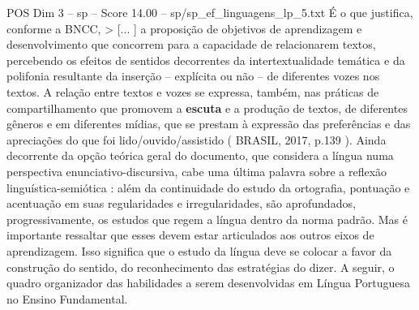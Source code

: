 \begin{textsample}{POS Dim 3 – sp – Score 14.00 – sp/sp\_ef\_linguagens\_lp\_5.txt}
É o que justifica, conforme a BNCC, > [... ] a proposição de objetivos de aprendizagem e desenvolvimento que concorrem para a capacidade de relacionarem textos, percebendo os efeitos de sentidos decorrentes da intertextualidade temática e da polifonia resultante da inserção – explícita ou não – de diferentes vozes nos textos.
A relação entre textos e vozes se expressa, também, nas práticas de compartilhamento que promovem a \textbf{escuta} e a produção de textos, de diferentes gêneros e em diferentes mídias, que se prestam à expressão das preferências e das apreciações do que foi lido/ouvido/assistido ( BRASIL, 2017, p.139 ).
Ainda decorrente da opção teórica geral do documento, que considera a língua numa perspectiva enunciativo-discursiva, cabe uma última palavra sobre a reflexão linguística-semiótica : além da continuidade do estudo da ortografia, pontuação e acentuação em suas regularidades e irregularidades, são aprofundados, progressivamente, os estudos que regem a língua dentro da norma padrão.
Mas é importante ressaltar que esses devem estar articulados aos outros eixos de aprendizagem.
Isso significa que o estudo da língua deve se colocar a favor da construção do sentido, do reconhecimento das estratégias do dizer.
A seguir, o quadro organizador das habilidades a serem desenvolvidas em Língua Portuguesa no Ensino Fundamental.

\end{textsample}
